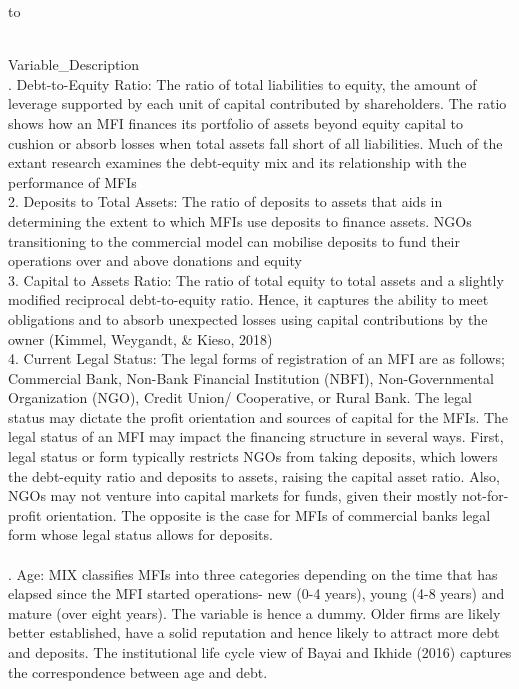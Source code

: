 \documentclass[a4paper,nobind]{templates/ociamthesis}
\begin{document}
\begin{longtabu} to 
\caption{\label{tab:unnamed-chunk-14}Description of Variables}\\
\toprule
Variable\_Description\\
. Debt-to-Equity Ratio: The ratio of total liabilities to equity, the amount of leverage supported by each unit of capital contributed by shareholders. The ratio shows how an MFI finances its portfolio of assets beyond equity capital to cushion or absorb losses when total assets fall short of all liabilities. Much of the extant research examines the debt-equity mix and its relationship with the performance of MFIs\\
2. Deposits to Total Assets: The ratio of deposits to assets that aids in determining the extent to which MFIs use deposits to finance assets. NGOs transitioning to the commercial model can mobilise deposits  to fund their operations over and above donations and equity\\
3. Capital to Assets Ratio: The ratio of total equity to total assets and a slightly modified reciprocal debt-to-equity ratio. Hence, it captures the ability to meet obligations and to absorb unexpected losses using capital contributions by the owner (Kimmel, Weygandt, \& Kieso, 2018)\\
4. Current Legal Status: The legal forms of registration of an MFI are as follows; Commercial Bank, Non-Bank Financial Institution (NBFI), Non-Governmental Organization (NGO), Credit Union/ Cooperative, or Rural Bank. The legal status may dictate the profit orientation and sources of capital for the MFIs. The legal status of an MFI may impact the financing structure in several ways. First, legal status or form typically restricts NGOs from taking deposits, which lowers the debt-equity ratio and deposits to assets, raising the capital asset ratio. Also, NGOs may not venture into capital markets for funds, given their mostly not-for-profit orientation. The opposite is the case for MFIs of commercial banks legal form whose legal status allows for deposits.\\
\\
.  Age: MIX classifies MFIs into three categories depending on the time that has elapsed since the MFI started operations- new (0-4 years), young (4-8 years) and mature (over eight years). The variable is hence a dummy. Older firms are likely better established, have a solid reputation and hence likely to attract more debt and deposits. The institutional life cycle view of Bayai and Ikhide (2016) captures the correspondence between age and debt.\\

\end{longtabu}
\end{document}
